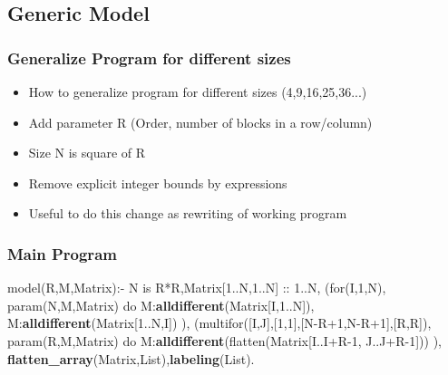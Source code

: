 \documentclass{beamer}
\begin{document}
\subsection{Generic Model}

\begin{frame}
\frametitle{Generalize Program for different sizes}
\begin{itemize}
\item How to generalize program for different sizes (4,9,16,25,36...)
\item Add parameter R (Order, number of blocks in a row/column)
\item Size N is square of R
\item Remove explicit integer bounds by expressions 
\item Useful to do this change as rewriting of working program
\end{itemize}

\end{frame}
\begin{frame}[fragile]
\frametitle{Main Program}
\begin{semiverbatim}
model(R,M,Matrix):-
    N is R*R,Matrix[1..N,1..N] :: 1..N,
    (for(I,1,N),
     param(N,M,Matrix) do
        M:{\bf{}alldifferent}(Matrix[I,1..N]),
        M:{\bf{}alldifferent}(Matrix[1..N,I])
    ),
    (multifor([I,J],[1,1],[N-R+1,N-R+1],[R,R]),
     param(R,M,Matrix) do
        M:{\bf{}alldifferent}(flatten(Matrix[I..I+R-1,
                                 J..J+R-1]))
    ),
    {\bf{}flatten_array}(Matrix,List),{\bf{}labeling}(List).
\end{semiverbatim}
\end{frame}
\end{document}
